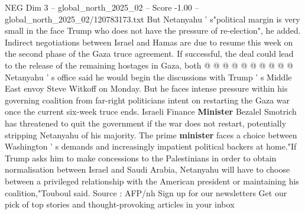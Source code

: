 \begin{textsample}{NEG Dim 3 – global\_north\_2025\_02 – Score -1.00 – global\_north\_2025\_02/120783173.txt}
But Netanyahu ' s"political margin is very small in the face Trump who does not have the pressure of re-election", he added.
Indirect negotiations between Israel and Hamas are due to resume this week on the second phase of the Gaza truce agreement.
If successful, the deal could lead to the release of the remaining hostages in Gaza, both @ @ @ @ @ @ @ @ @ @ Netanyahu ' s office said he would begin the discussions with Trump ' s Middle East envoy Steve Witkoff on Monday.
But he faces intense pressure within his governing coalition from far-right politicians intent on restarting the Gaza war once the current six-week truce ends.
Israeli Finance \textbf{Minister} Bezalel Smotrich has threatened to quit the government if the war does not restart, potentially stripping Netanyahu of his majority.
The prime \textbf{minister} faces a choice between Washington ' s demands and increasingly impatient political backers at home."If Trump asks him to make concessions to the Palestinians in order to obtain normalisation between Israel and Saudi Arabia, Netanyahu will have to choose between a privileged relationship with the American president or maintaining his coalition,"Touboul said.
Source : AFP/nh Sign up for our newsletters Get our pick of top stories and thought-provoking articles in your inbox

\end{textsample}
